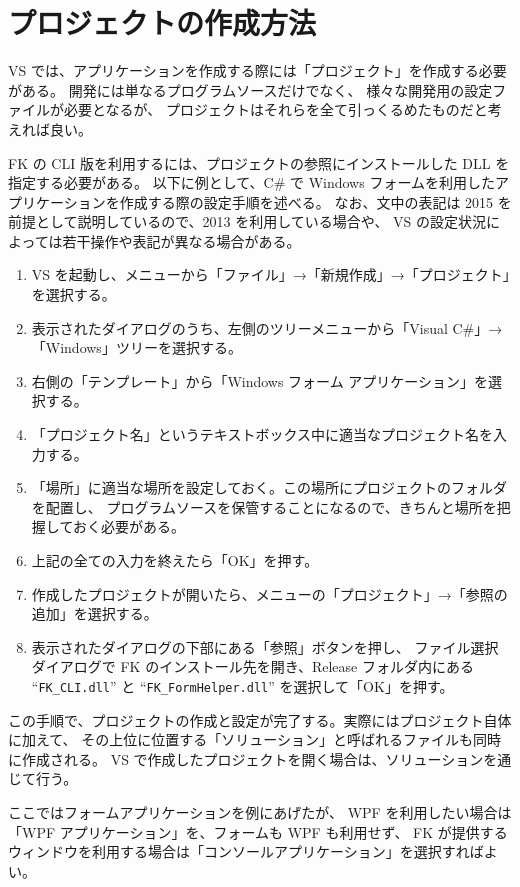 \documentclass[a4j]{jarticle}
\begin{document}
\section{プロジェクトの作成方法}
VS では、アプリケーションを作成する際には「プロジェクト」を作成する必要がある。
開発には単なるプログラムソースだけでなく、
様々な開発用の設定ファイルが必要となるが、
プロジェクトはそれらを全て引っくるめたものだと考えれば良い。

FK の CLI 版を利用するには、プロジェクトの参照にインストールした DLL を指定する必要がある。
以下に例として、C\# で Windows フォームを利用したアプリケーションを作成する際の設定手順を述べる。
なお、文中の表記は 2015 を前提として説明しているので、2013 を利用している場合や、
VS の設定状況によっては若干操作や表記が異なる場合がある。

\begin{enumerate}
 \item VS を起動し、メニューから「ファイル」→「新規作成」→「プロジェクト」を選択する。
 \item 表示されたダイアログのうち、左側のツリーメニューから「Visual C\#」→「Windows」ツリーを選択する。
 \item 右側の「テンプレート」から「Windows フォーム アプリケーション」を選択する。
 \item 「プロジェクト名」というテキストボックス中に適当なプロジェクト名を入力する。
 \item 「場所」に適当な場所を設定しておく。この場所にプロジェクトのフォルダを配置し、
	プログラムソースを保管することになるので、きちんと場所を把握しておく必要がある。
 \item 上記の全ての入力を終えたら「OK」を押す。
 \item 作成したプロジェクトが開いたら、メニューの「プロジェクト」→「参照の追加」を選択する。
 \item 表示されたダイアログの下部にある「参照」ボタンを押し、
 	ファイル選択ダイアログで FK のインストール先を開き、Release フォルダ内にある
 	``\verb+FK_CLI.dll+'' と ``\verb+FK_FormHelper.dll+'' を選択して「OK」を押す。
\end{enumerate}

この手順で、プロジェクトの作成と設定が完了する。実際にはプロジェクト自体に加えて、
その上位に位置する「ソリューション」と呼ばれるファイルも同時に作成される。
VS で作成したプロジェクトを開く場合は、ソリューションを通じて行う。

ここではフォームアプリケーションを例にあげたが、
WPF を利用したい場合は「WPF アプリケーション」を、フォームも WPF も利用せず、
FK が提供するウィンドウを利用する場合は「コンソールアプリケーション」を選択すればよい。
\end{document}
